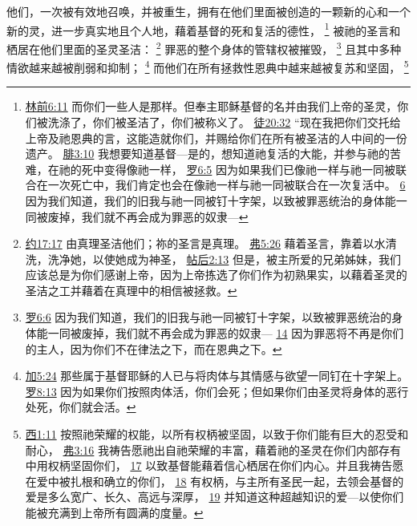 \documentclass[12pt, a4paper, oneside]{ctexart}
\newcounter{parnum}[section]
\newcommand{\N}{%
   \noindent\refstepcounter{parnum}%
    \makebox[\parindent][l]{\textbf{\arabic{parnum}.}}}
\begin{document}
\N 他们，一次被有效地召唤，并被重生，拥有在他们里面被创造的一颗新的心和一个新的灵，进一步真实地且个人地，藉着基督的死和复活的德性，
	\footnote {
		\href{https://biblehub.com/1_corinthians/6-11.htm}{林前6:11} 而你们一些人是那样。但奉主耶稣基督的名并由我们上帝的圣灵，你们被洗涤了，你们被圣洁了，你们被称义了。
		\href{https://biblehub.com/acts/20-32.htm}{徒20:32} “现在我把你们交托给上帝及祂恩典的言，这能造就你们，并赐给你们在所有被圣洁的人中间的一份遗产。
		\href{https://biblehub.com/philippians/3-10.htm}{腓3:10} 我想要知道基督---是的，想知道祂复活的大能，并参与祂的苦难，在祂的死中变得像祂一样，
		\href{https://biblehub.com/romans/6-5.htm}{罗6:5} 因为如果我们已像祂一样与祂一同被联合在一次死亡中，我们肯定也会在像祂一样与祂一同被联合在一次复活中。
		\href{https://biblehub.com/romans/6-6.htm}{6} 因为我们知道，我们的旧我与祂一同被钉十字架，以致被罪恶统治的身体能一同被废掉，我们就不再会成为罪恶的奴隶---
	}
	被祂的圣言和栖居在他们里面的圣灵圣洁：
	\footnote {
		\href{https://biblehub.com/john/17-17.htm}{约17:17} 由真理圣洁他们；祢的圣言是真理。
		\href{https://biblehub.com/ephesians/5-26.htm}{弗5:26} 藉着圣言，靠着以水清洗，洗净她，以使她成为神圣，
		\href{https://biblehub.com/2_thessalonians/2-13.htm}{帖后2:13} 但是，被主所爱的兄弟姊妹，我们应该总是为你们感谢上帝，因为上帝拣选了你们作为初熟果实，以藉着圣灵的圣洁之工并藉着在真理中的相信被拯救。
	}
	罪恶的整个身体的管辖权被摧毁，
	\footnote {
		\href{https://biblehub.com/romans/6-6.htm}{罗6:6} 因为我们知道，我们的旧我与祂一同被钉十字架，以致被罪恶统治的身体能一同被废掉，我们就不再会成为罪恶的奴隶---
		\href{https://biblehub.com/romans/6-14.htm}{14} 因为罪恶将不再是你们的主人，因为你们不在律法之下，而在恩典之下。
	}
	且其中多种情欲越来越被削弱和抑制；
	\footnote {
		\href{https://biblehub.com/galatians/5-24.htm}{加5:24} 那些属于基督耶稣的人已与将肉体与其情感与欲望一同钉在十字架上。
		\href{https://biblehub.com/romans/8-13.htm}{罗8:13} 因为如果你们按照肉体活，你们会死；但如果你们由圣灵将身体的恶行处死，你们就会活。
	}
	而他们在所有拯救性恩典中越来越被复苏和坚固，
	\footnote {
		\href{https://biblehub.com/colossians/1-11.htm}{西1:11} 按照祂荣耀的权能，以所有权柄被坚固，以致于你们能有巨大的忍受和耐心，
		\href{https://biblehub.com/ephesians/3-16.htm}{弗3:16} 我祷告愿祂出自祂荣耀的丰富，藉着祂的圣灵在你们内部存有中用权柄坚固你们，
		\href{https://biblehub.com/ephesians/3-17.htm}{17} 以致基督能藉着信心栖居在你们内心。并且我祷告愿在爱中被扎根和确立的你们，
		\href{https://biblehub.com/ephesians/3-18.htm}{18} 有权柄，与主所有圣民一起，去领会基督的爱是多么宽广、长久、高远与深厚，
		\href{https://biblehub.com/ephesians/3-19.htm}{19} 并知道这种超越知识的爱---以使你们能被充满到上帝所有圆满的度量。
	}
\end{document}
